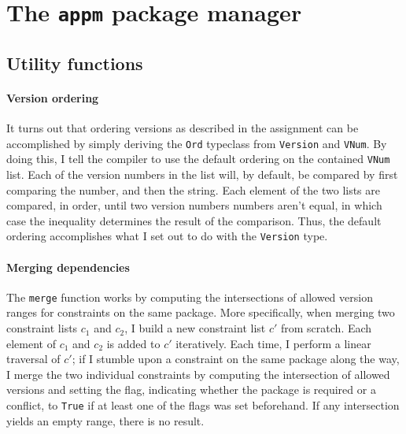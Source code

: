 \section*{The \texttt{appm} package manager}

\subsection*{Utility functions}
\paragraph{Version ordering}
It turns out that ordering versions as described in the assignment can be accomplished by simply deriving the \texttt{Ord} typeclass from \texttt{Version} and \texttt{VNum}. By doing this, I tell the compiler to use the default ordering on the contained \texttt{VNum} list. Each of the version numbers in the list will, by default, be compared by first comparing the number, and then the string. Each element of the two lists are compared, in order, until two version numbers numbers aren't equal, in which case the inequality determines the result of the comparison. Thus, the default ordering accomplishes what I set out to do with the \texttt{Version} type.

%

\paragraph{Merging dependencies}
 The \texttt{merge} function works by computing the intersections of allowed version ranges for constraints on the same package. More specifically, when merging two constraint lists $c_1$ and $c_2$, I build a new constraint list $c'$ from scratch. Each element of $c_1$ and $c_2$ is added to $c'$ iteratively. Each time, I perform a linear traversal of $c'$; if I stumble upon a constraint on the same package along the way, I merge the two individual constraints by computing the intersection of allowed versions and setting the flag, indicating whether the package is required or a conflict, to \texttt{True} if at least one of the flags was set beforehand. If any intersection yields an empty range, there is no result.

